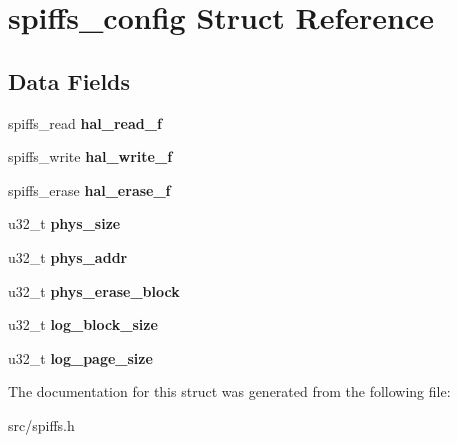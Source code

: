 \hypertarget{structspiffs__config}{}\section{spiffs\+\_\+config Struct Reference}
\label{structspiffs__config}
\subsection*{Data Fields}
\begin{DoxyCompactItemize}
\item 
\mbox{\label{structspiffs__config_a2d2cc2d17896ba4f5e78c524cd7da76b}} 
spiffs\+\_\+read {\bfseries hal\+\_\+read\+\_\+f}
\item 
\mbox{\label{structspiffs__config_ab9402faf21097e938cb86b70efab38b4}} 
spiffs\+\_\+write {\bfseries hal\+\_\+write\+\_\+f}
\item 
\mbox{\label{structspiffs__config_a86af9c6671604e9c6e08cfe6c3fdfaeb}} 
spiffs\+\_\+erase {\bfseries hal\+\_\+erase\+\_\+f}
\item 
\mbox{\label{structspiffs__config_ad1746f2435254dd38ebdbf167a3289e0}} 
u32\+\_\+t {\bfseries phys\+\_\+size}
\item 
\mbox{\label{structspiffs__config_ad14f81b04bcc96bb09909015e06a5b3f}} 
u32\+\_\+t {\bfseries phys\+\_\+addr}
\item 
\mbox{\label{structspiffs__config_a5d33e08b152880f482c976f897a1632f}} 
u32\+\_\+t {\bfseries phys\+\_\+erase\+\_\+block}
\item 
\mbox{\label{structspiffs__config_afda08e08a059b922706188f6f2c557ac}} 
u32\+\_\+t {\bfseries log\+\_\+block\+\_\+size}
\item 
\mbox{\label{structspiffs__config_a2525c28d372c9d46152b9997972c25fd}} 
u32\+\_\+t {\bfseries log\+\_\+page\+\_\+size}
\end{DoxyCompactItemize}


The documentation for this struct was generated from the following file\+:\begin{DoxyCompactItemize}
\item 
src/spiffs.\+h\end{DoxyCompactItemize}

